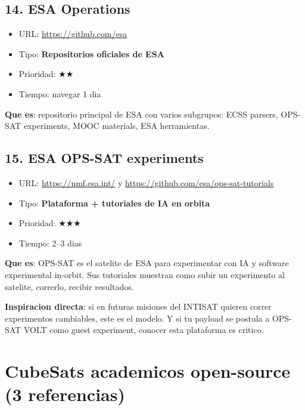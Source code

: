 \documentclass[11pt,a4paper,oneside]{report}
\begin{document}
\section{14. ESA Operations}

\begin{itemize}[leftmargin=1.5em]
  \item URL: \url{https://github.com/esa}
  \item Tipo: \textbf{Repositorios oficiales de ESA}
  \item Prioridad: $\bigstar\bigstar$
  \item Tiempo: navegar 1 dia
\end{itemize}

\textbf{Que es}: repositorio principal de ESA con varios subgrupos: ECSS
parsers, OPS-SAT experiments, MOOC materials, ESA herramientas.

\section{15. ESA OPS-SAT experiments}

\begin{itemize}[leftmargin=1.5em]
  \item URL: \url{https://nmf.esa.int/} y \url{https://github.com/esa/ops-sat-tutorials}
  \item Tipo: \textbf{Plataforma + tutoriales de IA en orbita}
  \item Prioridad: $\bigstar\bigstar\bigstar$
  \item Tiempo: 2--3 dias
\end{itemize}

\textbf{Que es}: OPS-SAT es el satelite de ESA para experimentar con IA y
software experimental in-orbit. Sus tutoriales muestran como subir un
experimento al satelite, correrlo, recibir resultados.

\begin{nota}
\textbf{Inspiracion directa}: si en futuras misiones del INTISAT quieren
correr experimentos cambiables, este es el modelo. Y si tu payload se
postula a OPS-SAT VOLT como guest experiment, conocer esta plataforma es
critico.
\end{nota}

\chapter{CubeSats academicos open-source (3 referencias)}
\end{document}
